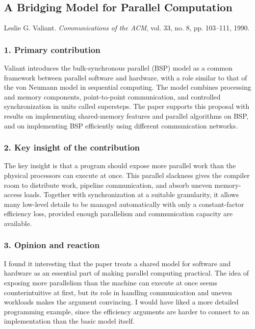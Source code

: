 \documentclass[11pt,a4paper]{article}
\begin{document}
\newpage
\subsection*{A Bridging Model for Parallel Computation}
{\small Leslie G. Valiant.
\emph{Communications of the ACM}, vol. 33, no. 8, pp. 103--111, 1990.}

\subsubsection*{1. Primary contribution}
Valiant introduces the bulk-synchronous parallel (BSP) model as a common
framework between parallel software and hardware, with a role similar to
that of the von Neumann model in sequential computing.
The model combines processing and memory components, point-to-point
communication, and controlled synchronization in units called supersteps.
The paper supports this proposal with results on implementing shared-memory
features and parallel algorithms on BSP, and on implementing BSP efficiently
using different communication networks.

\subsubsection*{2. Key insight of the contribution}
The key insight is that a program should expose more parallel work than
the physical processors can execute at once.
This parallel slackness gives the compiler room to distribute work,
pipeline communication, and absorb uneven memory-access loads.
Together with synchronization at a suitable granularity, it allows many
low-level details to be managed automatically with only a constant-factor
efficiency loss, provided enough parallelism and communication capacity
are available.

\subsubsection*{3. Opinion and reaction}
I found it interesting that the paper treats a shared model for software
and hardware as an essential part of making parallel computing practical.
The idea of exposing more parallelism than the machine can execute at once
seems counterintuitive at first, but its role in handling communication
and uneven workloads makes the argument convincing.
I would have liked a more detailed programming example, since the efficiency
arguments are harder to connect to an implementation than the basic model
itself.
\end{document}
